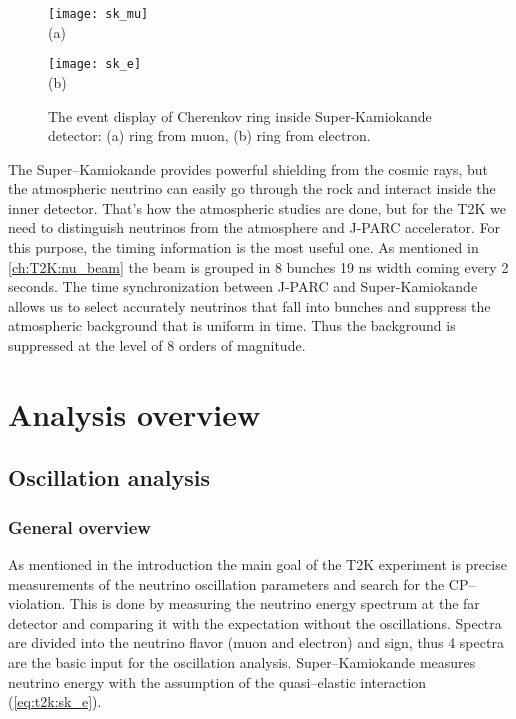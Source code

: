 \documentclass[../main.tex]{subfiles}
\begin{document}
\begin{figure}[!ht]
  \centering
  \begin{minipage}{0.49\linewidth}
    \centering
    \texttt{[image: sk\_mu]} \\ (a)
  \end{minipage}
  \begin{minipage}{0.49\linewidth}
    \centering
    \texttt{[image: sk\_e]} \\ (b)
  \end{minipage}
    \caption{The event display of Cherenkov ring inside Super-Kamiokande detector: (a) ring from muon, (b) ring from electron.}
    \label{fig:T2K:sk_PID}
\end{figure}

The Super--Kamiokande provides powerful shielding from the cosmic rays, but the atmospheric neutrino can easily go through the rock and interact inside the inner detector. That's how the atmospheric studies are done, but for the T2K we need to distinguish neutrinos from the atmosphere and J-PARC accelerator. For this purpose, the timing information is the most useful one. As mentioned in \autoref{ch:T2K:nu_beam} the beam is grouped in 8 bunches 19 ns width coming every 2 seconds. The time synchronization between J-PARC and Super-Kamiokande allows us to select accurately neutrinos that fall into bunches and suppress the atmospheric background that is uniform in time. Thus the background is suppressed at the level of 8 orders of magnitude.


\section{Analysis overview}
\subsection{Oscillation analysis}
\subsubsection{General overview}
As mentioned in the introduction the main goal of the T2K experiment is precise measurements of the neutrino oscillation parameters and search for the CP--violation. This is done by measuring the neutrino energy spectrum at the far detector and comparing it with the expectation without the oscillations. Spectra are divided into the neutrino flavor (muon and electron) and sign, thus 4 spectra are the basic input for the oscillation analysis. Super--Kamiokande measures neutrino energy with the assumption of the quasi--elastic interaction (\autoref{eq:t2k:sk_e}).
\end{document}
